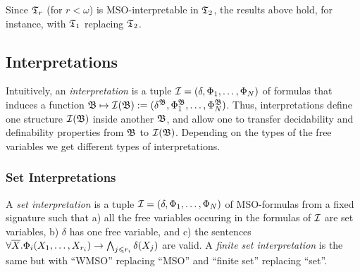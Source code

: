 \begin{remark} 
Since $\mathfrak{T}_r$ (for $r < \omega$) is MSO-interpretable in $\mathfrak{T}_2$, the results above hold, for instance, with $\mathfrak{T}_1$ replacing $\mathfrak{T}_2$.
\end{remark}

\subsection{Interpretations}

 

Intuitively, an \emph{interpretation} is a tuple ${\mathcal I} = (\delta, \Phi_1, \dots, \Phi_N)$ of formulas that induces a function 
$\mathfrak{B} \mapsto {\mathcal I}(\mathfrak{B}) := (\delta^{\mathfrak{B}}, \Phi_1^{\mathfrak{B}}, \dots, \Phi_N^{\mathfrak{B}})$. Thus, interpretations define one structure ${\mathcal I}(\mathfrak{B})$ 
inside another $\mathfrak{B}$, and allow one to transfer decidability and definability properties from $\mathfrak{B}$ to ${\mathcal I}(\mathfrak{B})$. 
Depending on the types of the free variables we get different types of interpretations.

\subsubsection{Set Interpretations}

\begin{definition}
A \emph{set interpretation} is a tuple  ${\mathcal I} = (\delta, \Phi_1, \dots, \Phi_N)$ of MSO-formulas from a fixed signature such that a) all the free variables occuring in the formulas of ${\mathcal I}$ are set variables, b) $\delta$ has one free variable, and c) the sentences $\forall \mbox{$\overline {X}$}. \Phi_i(X_1, \dots, X_{r_i}) \to \bigwedge_{j \leqslant r_i} \delta(X_j)$ are valid. A \emph{finite set interpretation} is the same but with ``WMSO'' replacing ``MSO'' and ``finite set'' replacing ``set''.
\end{definition}

